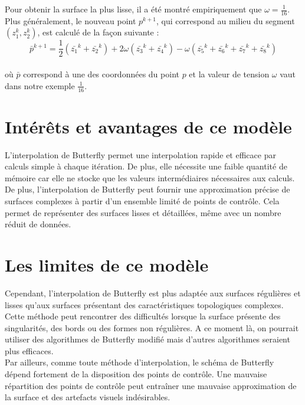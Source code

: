 \documentclass{article}
\begin{document}
Pour obtenir la surface la plus lisse, il a été montré empiriquement que $\omega = \frac{1}{16}$. Plus généralement, le nouveau point $p^{k+1}$, qui correspond au milieu du segment $(z_1^k, z_2^k)$, est calculé de la façon suivante : \\
$$
\bar{p}^{k+1} = \frac{1}{2}(\bar{z_1}^{k}+\bar{z_2}^{k}) + 2 \omega (\bar{z_3}^{k} + \bar{z_4}^{k}) -\omega(\bar{z_5}^{k} + \bar{z_6}^{k} + \bar{z_7}^{k} + \bar{z_8}^{k})
$$\\
où $\bar{p}$ correspond à une des coordonnées du point $p$ et la valeur de tension $\omega$ vaut dans notre exemple $\frac{1}{16}$.

\section{Intérêts et avantages de ce modèle}

L'interpolation de Butterfly permet une interpolation rapide et efficace par calculs simple à chaque itération. De plus, elle nécessite une faible quantité de mémoire car elle ne stocke que les valeurs intermédiaires nécessaires aux calculs.\\

De plus, l'interpolation de Butterfly peut fournir une approximation précise de surfaces complexes à partir d'un ensemble limité de points de contrôle. Cela permet de représenter des surfaces lisses et détaillées, même avec un nombre réduit de données.

\section{Les limites de ce modèle}

Cependant, l'interpolation de Butterfly est plus adaptée aux surfaces régulières et lisses qu'aux surfaces présentant des caractéristiques topologiques complexes. Cette méthode peut rencontrer des difficultés lorsque la surface présente des singularités, des bords ou des formes non régulières. A ce moment là, on pourrait utiliser des algorithmes de Butterfly modifié mais d'autres algorithmes seraient plus efficaces. \\

Par ailleurs, comme toute méthode d'interpolation, le schéma de Butterfly dépend fortement de la disposition des points de contrôle. Une mauvaise répartition des points de contrôle peut entraîner une mauvaise approximation de la surface et des artefacts visuels indésirables. \\
\end{document}
